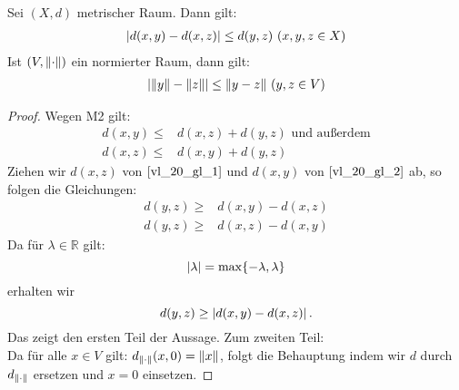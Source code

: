 \begin{Proposition}{%
	Sei $(X,d)$ metrischer Raum. Dann gilt:
	\begin{align*}
		\abs{d(x,y)- d(x,z)} \leq d(y,z) \text{ } (x,y,z \in X)
	\end{align*}
	Ist $(V, \norm{\cdot})$ ein normierter Raum, dann gilt:
	\begin{align*}
		\abs{\norm{y} - \norm{z} } \leq \norm{y -z} \text{ } (y, z \in V)
	\end{align*}
}\end{Proposition}

\begin{proof}
	Wegen M2 gilt:
	\begin{align} \label{vl_20_gl_1}
		d(x,y) \leq & d(x,z) + d(y,z) \text{ und außerdem} \\
		d(x,z) \leq & d(x,y) + d(y,z) \label{vl_20_gl_2}
	\end{align}
	Ziehen wir $d(x,z)$ von $\ref{vl_20_gl_1}$ und $d(x,y)$ von $\ref{vl_20_gl_2}$ ab, so folgen die Gleichungen:
	\begin{align*}
		d(y,z) \geq & d(x,y) - d(x,z) \\
		d(y,z) \geq & d(x,z) - d(x,y) 
	\end{align*}
	Da für $\lambda \in \mathbb{R}$ gilt:
		$$
			\abs{\lambda} = 
				\max\{-\lambda, \lambda\}
		$$
		erhalten wir
		$$
			d(y,z) \geq \abs{d(x,y) - d(x,z)}\,.
		$$
		Das zeigt den ersten Teil der Aussage. Zum zweiten Teil:\\
		Da für alle $x \in V$ gilt: $d_{\norm{\cdot}} (x,0) = \norm{x}$, 
		folgt die Behauptung indem wir $d$ durch $d_{\norm{\cdot}}$ ersetzen und 
		$x = 0$ einsetzen.
\end{proof}